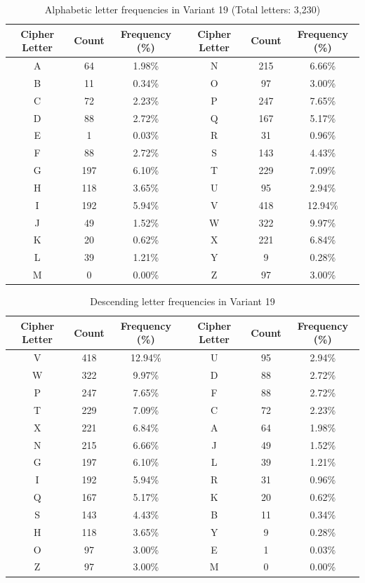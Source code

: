 \documentclass[12pt,a4paper]{article}
\begin{document}
\begin{table}[H]
\centering
\caption{Alphabetic letter frequencies in Variant 19 (Total letters: 3,230)}
\label{tab:crypto_alpha}
\small
\begin{tabular}{ccc|ccc}
\toprule
\textbf{Cipher Letter} & \textbf{Count} & \textbf{Frequency (\%)} & \textbf{Cipher Letter} & \textbf{Count} & \textbf{Frequency (\%)} \\
\midrule
A & 64  & 1.98\% & N & 215 & 6.66\% \\
B & 11  & 0.34\% & O & 97  & 3.00\% \\
C & 72  & 2.23\% & P & 247 & 7.65\% \\
D & 88  & 2.72\% & Q & 167 & 5.17\% \\
E & 1   & 0.03\% & R & 31  & 0.96\% \\
F & 88  & 2.72\% & S & 143 & 4.43\% \\
G & 197 & 6.10\% & T & 229 & 7.09\% \\
H & 118 & 3.65\% & U & 95  & 2.94\% \\
I & 192 & 5.94\% & V & 418 & 12.94\% \\
J & 49  & 1.52\% & W & 322 & 9.97\% \\
K & 20  & 0.62\% & X & 221 & 6.84\% \\
L & 39  & 1.21\% & Y & 9   & 0.28\% \\
M & 0   & 0.00\% & Z & 97  & 3.00\% \\
\bottomrule
\end{tabular}
\end{table}

\begin{table}[H]
\centering
\caption{Descending letter frequencies in Variant 19}
\label{tab:crypto_desc}
\small
\begin{tabular}{ccc|ccc}
\toprule
\textbf{Cipher Letter} & \textbf{Count} & \textbf{Frequency (\%)} & \textbf{Cipher Letter} & \textbf{Count} & \textbf{Frequency (\%)} \\
\midrule
V & 418 & 12.94\% & U & 95 & 2.94\% \\
W & 322 & 9.97\%  & D & 88 & 2.72\% \\
P & 247 & 7.65\%  & F & 88 & 2.72\% \\
T & 229 & 7.09\%  & C & 72 & 2.23\% \\
X & 221 & 6.84\%  & A & 64 & 1.98\% \\
N & 215 & 6.66\%  & J & 49 & 1.52\% \\
G & 197 & 6.10\%  & L & 39 & 1.21\% \\
I & 192 & 5.94\%  & R & 31 & 0.96\% \\
Q & 167 & 5.17\%  & K & 20 & 0.62\% \\
S & 143 & 4.43\%  & B & 11 & 0.34\% \\
H & 118 & 3.65\%  & Y & 9  & 0.28\% \\
O & 97  & 3.00\%  & E & 1  & 0.03\% \\
Z & 97  & 3.00\%  & M & 0  & 0.00\% \\
\bottomrule
\end{tabular}
\end{table}
\end{document}
